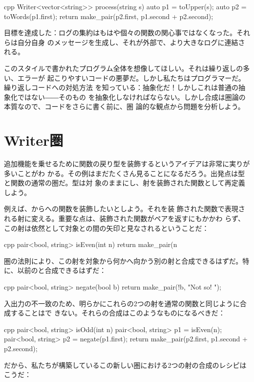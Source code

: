 \begin{snip}{cpp}
Writer<vector<string>> process(string s) {
    auto p1 = toUpper(s);
    auto p2 = toWords(p1.first);
    return make_pair(p2.first, p1.second + p2.second);
}
\end{snip}
目標を達成した：ログの集約はもはや個々の関数の関心事ではなくなった。それらは自分自身
のメッセージを生成し、それが外部で、より大きなログに連結される。

このスタイルで書かれたプログラム全体を想像してほしい。それは繰り返しの多い、エラーが
起こりやすいコードの悪夢だ。しかし私たちはプログラマーだ。繰り返しコードへの対処方法
を知っている：抽象化だ！しかしこれは普通の抽象化ではない――そのもの
を抽象化しなければならない。しかし合成は圏論の本質なので、コードをさらに書く前に、圏
論的な観点から問題を分析しよう。

\section{Writer圏}

追加機能を乗せるために関数の戻り型を装飾するというアイデアは非常に実りが多いことがわ
かる。その例はまだたくさん見ることになるだろう。出発点は型と関数の通常の圏だ。型は対
象のままにし、射を装飾された関数として再定義しよう。

例えば、からへの関数を装飾したいとしよう。それを装
飾された関数で表現される射に変える。重要な点は、装飾された関数がペアを返すにもかかわ
らず、この射は依然として対象との間の矢印と見なされるということだ：

\begin{snip}{cpp}
pair<bool, string> isEven(int n) {
    return make_pair(n %
}
\end{snip}
圏の法則により、この射を対象から何かへ向かう別の射と合成できるはずだ。特
に、以前のと合成できるはずだ：

\begin{snip}{cpp}
pair<bool, string> negate(bool b) {
    return make_pair(!b, "Not so! ");
}
\end{snip}
入出力の不一致のため、明らかにこれらの2つの射を通常の関数と同じように合成することはで
きない。それらの合成はこのようなものになるべきだ：

\begin{snip}{cpp}
pair<bool, string> isOdd(int n) {
    pair<bool, string> p1 = isEven(n);
    pair<bool, string> p2 = negate(p1.first);
    return make_pair(p2.first, p1.second + p2.second);
}
\end{snip}
だから、私たちが構築しているこの新しい圏における2つの射の合成のレシピはこうだ：


